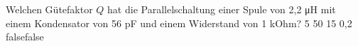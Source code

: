     {Welchen Gütefaktor $Q$ hat die Parallelschaltung einer Spule von 2,2 \si{\micro\henry} mit einem Kondensator von 56 pF und einem Widerstand von 1 kOhm?}
    {5}
    {50}
    {15}
    {0,2}
    {false}{false}